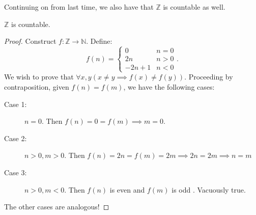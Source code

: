 
Continuing on from last time, we also have that \( \mathbb{Z} \) is countable as well.

\begin{theorem}
	\( \mathbb{Z} \) is countable.
\end{theorem}
\begin{proof}
	Construct \( f \colon \mathbb{Z} \to  \mathbb{N} \). Define:
	\[
		f(n) = \begin{cases}
			0 & n = 0 \\
			2n & n > 0 \\
			-2n + 1 & n < 0
		\end{cases}
	.\] We wish to prove that \( \forall x,y (x \neq  y \implies f(x) \neq  f(y)) \). Proceeding by contraposition, given \( f(n)=f(m) \), we have the following cases:
	\begin{description}
		\item[Case 1:] \( n = 0 \). Then \( f(n) = 0 = f(m) \implies m = 0\).
		\item[Case 2:] \( n > 0, m > 0 \). Then \( f(n) = 2n = f(m) = 2m \implies 2n = 2m \implies n = m \)
		\item[Case 3:] \( n > 0, m < 0 \). Then \( f(n) \) is even and \( f(m) \) is odd \contra. Vacuously true.
	\end{description}
	The other cases are analogous!
\end{proof}

